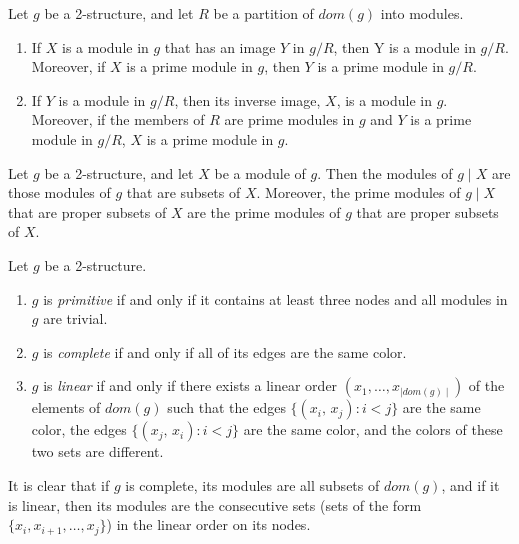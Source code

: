 \begin{mytheo}
    \label{thm:2-2}
    Let $g$ be a 2-structure, and let $R$ be a partition of $dom(g)$ into modules.
    \begin{enumerate}
        \item If $X$ is a module in $g$ that has an image $Y$ in $g / R$, then Y is a module in $g / R$.
        Moreover, if $X$ is a prime module in $g$, then $Y$ is a prime module in $g / R$.
        \item If $Y$ is a module in $g / R$, then its inverse image, $X$, is a module in $g$.
        Moreover, if the members of $R$ are prime modules in $g$ and $Y$ is a prime module in $g / R$, $X$ is a prime module in $g$.
    \end{enumerate}
\end{mytheo}

\begin{mylem}
    \label{lem:2-3}
    Let $g$ be a 2-structure, and let $X$ be a module of $g$.
    Then the modules of $g \mid X$ are those modules of $g$ that are subsets of $X$.
    Moreover, the prime modules of $g \mid X$ that are proper subsets of $X$ are the prime modules of $g$ that are proper subsets of $X$.
\end{mylem}


\begin{mydef}
    \label{def:2-4}
    Let $g$ be a 2-structure.
    \begin{enumerate}
        \item $g$ is \textit{primitive} if and only if it contains at least three nodes and all modules in $g$ are trivial.
        \item $g$ is \textit{complete} if and only if all of its edges are the same color.
        \item $g$ is \textit{linear} if and only if there exists a linear order $(x_1, \dots, x_{\mid dom(g) \mid})$ of the elements of $dom(g)$ such that the edges $\{(x_i,\, x_j): i < j\}$ are the same color, the edges $\{(x_j,\, x_i): i < j\}$ are the same color, and the colors of these two sets are different.
    \end{enumerate}
\end{mydef}

It is clear that if $g$ is complete, its modules are all subsets of $dom(g)$, and if it is linear, then its modules are the consecutive sets (sets of the form $\{x_i, x_{i+1}, \dots, x_j\}$) in the linear order on its nodes.

